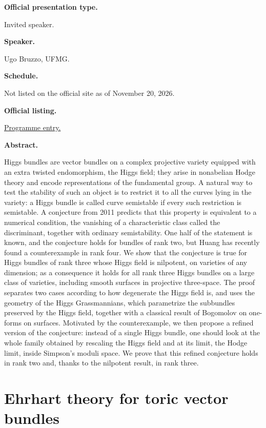 \medskip\noindent
{\bf Official presentation type.}

Invited speaker.

\medskip\noindent
{\bf Speaker.}

Ugo Bruzzo, UFMG.

\medskip\noindent
{\bf Schedule.}

Not listed on the official site as of
November 20, 2026.

\medskip\noindent
{\bf Official listing.}

\href{%
https://sites.google.com/view/%
geoalgcompluff/legal/%
legal-2027-resumos#h.59gubrdmgdxn%
}{Programme entry.}

\medskip\noindent
{\bf Abstract.}

Higgs bundles are vector bundles on a complex
projective variety equipped with an extra
twisted endomorphism, the Higgs field; they
arise in nonabelian Hodge theory and encode
representations of the fundamental group. A
natural way to test the stability of such an
object is to restrict it to all the curves
lying in the variety: a Higgs bundle is
called curve semistable if every such
restriction is semistable. A conjecture from
2011 predicts that this property is
equivalent to a numerical condition, the
vanishing of a characteristic class called
the discriminant, together with ordinary
semistability. One half of the statement is
known, and the conjecture holds for bundles
of rank two, but Huang has recently found a
counterexample in rank four. We show that the
conjecture is true for Higgs bundles of rank
three whose Higgs field is nilpotent, on
varieties of any dimension; as a consequence
it holds for all rank three Higgs bundles on
a large class of varieties, including smooth
surfaces in projective three-space. The proof
separates two cases according to how
degenerate the Higgs field is, and uses the
geometry of the Higgs Grassmannians, which
parametrize the subbundles preserved by the
Higgs field, together with a classical result
of Bogomolov on one-forms on surfaces.
Motivated by the counterexample, we then
propose a refined version of the conjecture:
instead of a single Higgs bundle, one should
look at the whole family obtained by
rescaling the Higgs field and at its limit,
the Hodge limit, inside Simpson’s moduli
space. We prove that this refined conjecture
holds in rank two and, thanks to the
nilpotent result, in rank three.

\section{Ehrhart theory for toric vector
bundles}
\label{section-ehrhart-theory-for-toric}

